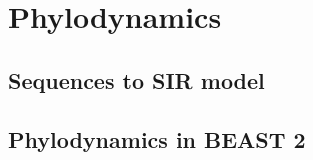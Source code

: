\documentclass{scrartcl}
\begin{document}
\section{Phylodynamics}

\subsection{Sequences to SIR model}

\subsection{Phylodynamics in BEAST 2}

\newpage
\begin{thebibliography}{99} %

 
\end{thebibliography}

\end{document}
